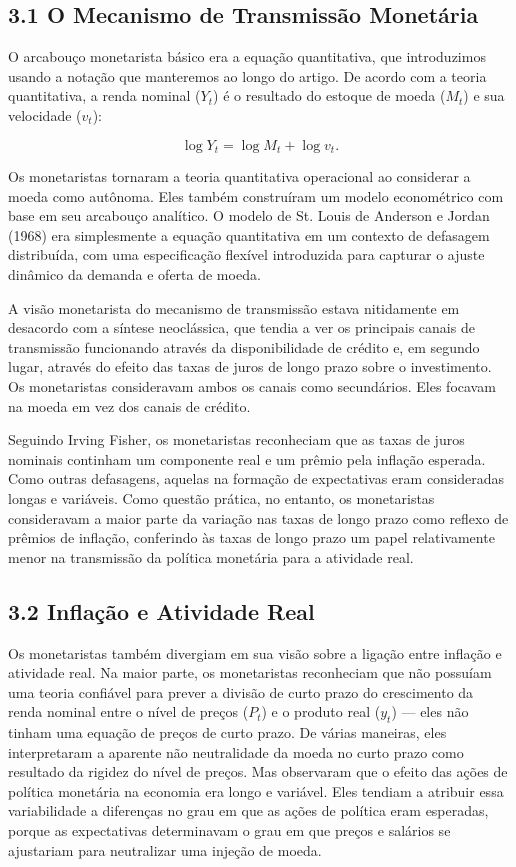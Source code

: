 \documentclass[12pt]{article}
\begin{document}
\subsection{3.1 O Mecanismo de Transmissão Monetária}

O arcabouço monetarista básico era a equação quantitativa, que introduzimos usando a notação que manteremos ao longo do artigo. De acordo com a teoria quantitativa, a renda nominal ($Y_t$) é o resultado do estoque de moeda ($M_t$) e sua velocidade ($v_t$):

\begin{equation}
\log Y_t = \log M_t + \log v_t. \tag{3.1}
\end{equation}

Os monetaristas tornaram a teoria quantitativa operacional ao considerar a moeda como autônoma. Eles também construíram um modelo econométrico com base em seu arcabouço analítico. O modelo de St. Louis de Anderson e Jordan (1968) era simplesmente a equação quantitativa em um contexto de defasagem distribuída, com uma especificação flexível introduzida para capturar o ajuste dinâmico da demanda e oferta de moeda.

A visão monetarista do mecanismo de transmissão estava nitidamente em desacordo com a síntese neoclássica, que tendia a ver os principais canais de transmissão funcionando através da disponibilidade de crédito e, em segundo lugar, através do efeito das taxas de juros de longo prazo sobre o investimento. Os monetaristas consideravam ambos os canais como secundários. Eles focavam na moeda em vez dos canais de crédito.

Seguindo Irving Fisher, os monetaristas reconheciam que as taxas de juros nominais continham um componente real e um prêmio pela inflação esperada. Como outras defasagens, aquelas na formação de expectativas eram consideradas longas e variáveis. Como questão prática, no entanto, os monetaristas consideravam a maior parte da variação nas taxas de longo prazo como reflexo de prêmios de inflação, conferindo às taxas de longo prazo um papel relativamente menor na transmissão da política monetária para a atividade real.

\subsection{3.2 Inflação e Atividade Real}

Os monetaristas também divergiam em sua visão sobre a ligação entre inflação e atividade real. Na maior parte, os monetaristas reconheciam que não possuíam uma teoria confiável para prever a divisão de curto prazo do crescimento da renda nominal entre o nível de preços ($P_t$) e o produto real ($y_t$) — eles não tinham uma equação de preços de curto prazo. De várias maneiras, eles interpretaram a aparente não neutralidade da moeda no curto prazo como resultado da rigidez do nível de preços. Mas observaram que o efeito das ações de política monetária na economia era longo e variável. Eles tendiam a atribuir essa variabilidade a diferenças no grau em que as ações de política eram esperadas, porque as expectativas determinavam o grau em que preços e salários se ajustariam para neutralizar uma injeção de moeda.
\end{document}

